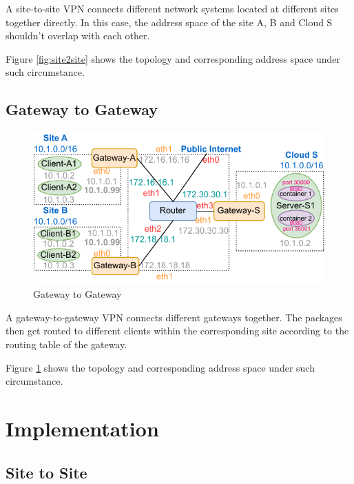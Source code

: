 \documentclass[article]{aaltoseries}
\begin{document}
A site-to-site VPN connects different network systems located at different sites together directly. In this case, the address space of the site A, B and Cloud S shouldn't overlap with each other.

Figure \ref{fig:site2site} shows the topology and corresponding address space under such circumstance.

\subsection{Gateway to Gateway}
\begin{figure}[t!]
  \begin{center}
    \includegraphics[width=1.1\textwidth]{figures/gateway-to-gateway.pdf}
    \caption{Gateway to Gateway}
    \label{fig:gateway2gateway}
  \end{center}
\end{figure}

A gateway-to-gateway VPN connects different gateways together. The packages then get routed to different clients within the corresponding site according to the routing table of the gateway.

Figure \ref{fig:gateway2gateway} shows the topology and corresponding address space under such circumstance.



\section{Implementation}



\subsection{Site to Site}
\end{document}
